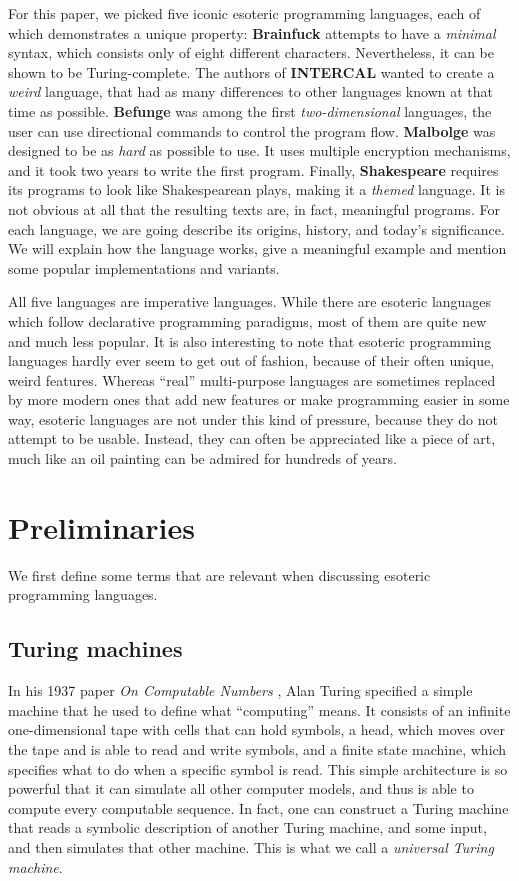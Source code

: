 \documentclass{sig-alternate}
\begin{document}
For this paper, we picked five iconic esoteric programming languages, each of which demonstrates a unique property:
\textbf{Brainfuck} attempts to have a \textit{minimal} syntax, which consists only of eight different characters. Nevertheless, it can be shown to be Turing-complete. The authors of \textbf{INTERCAL} wanted to create a \textit{weird} language, that had as many differences to other languages known at that time as possible. \textbf{Befunge} was among the first \textit{two-dimensional} languages, the user can use directional commands to control the program flow. \textbf{Malbolge} was designed to be as \textit{hard} as possible to use. It uses multiple encryption mechanisms, and it took two years to write the first program. Finally, \textbf{Shakespeare} requires its programs to look like Shakespearean plays, making it a \textit{themed} language. It is not obvious at all that the resulting texts are, in fact, meaningful programs. For each language, we are going describe its origins, history, and today's significance. We will explain how the language works, give a meaningful example and mention some popular implementations and variants.

All five languages are imperative languages. While there are esoteric languages which follow declarative programming paradigms, most of them are quite new and much less popular. It is also interesting to note that esoteric programming languages hardly ever seem to get out of fashion, because of their often unique, weird features. Whereas “real” multi-purpose languages are sometimes replaced by more modern ones that add new features or make programming easier in some way, esoteric languages are not under this kind of pressure, because they do not attempt to be usable. Instead, they can often be appreciated like a piece of art, much like an oil painting can be admired for hundreds of years.

\section{Preliminaries}

We first define some terms that are relevant when discussing esoteric programming languages.

\subsection{Turing machines}

In his 1937 paper \emph{On Computable Numbers} \cite{turing1937computable}, Alan Turing specified a simple machine that he used to define what “computing” means. It consists of an infinite one-dimensional tape with cells that can hold symbols, a head, which moves over the tape and is able to read and write symbols, and a finite state machine, which specifies what to do when a specific symbol is read. This simple architecture is so powerful that it can simulate all other computer models, and thus is able to compute every computable sequence.
In fact, one can construct a Turing machine that reads a symbolic description of another Turing machine, and some input, and then simulates that other machine. This is what we call a \emph{universal Turing machine}.
\end{document}
